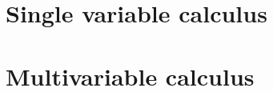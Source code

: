\documentclass[twoside,english]{book}
\theoremstyle{nonumberplain}
\theoremstyle{break}
\theoremstyle{break}
\theoremstyle{nonumberplain}
\begin{document}
\part{Single variable calculus}
\label{deel2}
\fi



 







\ifanalysis

\fi


\ifvc


\fi

\graphicspath{{figures/}}
\part{Multivariable calculus}
\label{deel3}




\ifcalculus

\fi
 \ifanalysis


\fi



\ifDE
{} 
\graphicspath{{figures/}}
\end{document}
